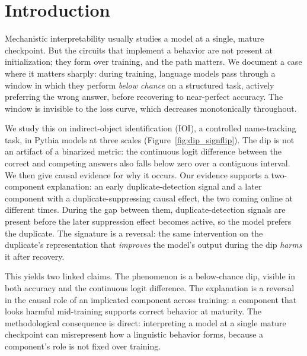 \documentclass[11pt]{article}
\begin{document}
\section{Introduction}
Mechanistic interpretability usually studies a model at a single, mature
checkpoint. But the circuits that implement a behavior are not present at
initialization; they form over training, and the path matters. We document a
case where it matters sharply: during training, language models pass through a
window in which they perform \emph{below chance} on a structured task, actively
preferring the wrong answer, before recovering to near-perfect accuracy. The
window is invisible to the loss curve, which decreases monotonically throughout.

We study this on indirect-object identification (IOI), a controlled
name-tracking task, in Pythia models at three scales
(Figure~\ref{fig:dip_signflip}). The dip is not an artifact of a binarized
metric: the continuous logit difference between the correct and competing
answers also falls below zero over a contiguous interval. We then give causal
evidence for why it occurs. Our evidence supports a two-component explanation: an
early duplicate-detection signal and a later component with a duplicate-suppressing causal effect, the two
coming online at different times. During
the gap between them, duplicate-detection signals are present before the
later suppression effect becomes active, so the model prefers the duplicate. The
signature is a reversal: the same intervention on the duplicate's representation
that \emph{improves} the model's output during the dip \emph{harms} it after
recovery.

This yields two linked claims. The phenomenon is a below-chance dip, visible in
both accuracy and the continuous logit difference. The explanation is a reversal
in the causal role of an implicated component across training: a component that
looks harmful mid-training supports correct behavior at maturity. The methodological
consequence is direct: interpreting a model at a single mature checkpoint can
misrepresent how a linguistic behavior forms, because a component's role is not
fixed over training.
\end{document}
